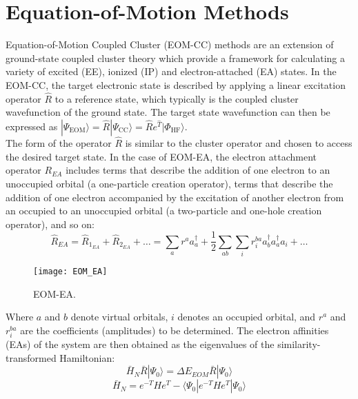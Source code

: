\section{Equation-of-Motion Methods} \label{sec:eom_theory}
Equation-of-Motion Coupled Cluster (EOM-CC) methods are an extension of ground-state coupled cluster theory which provide a framework for calculating a variety of excited (EE), ionized (IP) and electron-attached (EA) states. In the EOM-CC, the target electronic state is described by applying a linear excitation operator $\hat{R}$ to a reference state, which typically is the coupled cluster wavefunction of the ground state. The target state wavefunction can then be expressed as $|\Psi_{\text{EOM}}\rangle = \hat{R} |\Psi_{\text{CC}}\rangle = \hat{R} e^{\hat{T}} |\Phi_{\text{HF}}\rangle$.\\
The form of the operator $\hat{R}$ is similar to the cluster operator and chosen to access the desired target state. In the case of EOM-EA, the electron attachment operator $R_{EA}$ includes terms that describe the addition of one electron to an unoccupied orbital (a one-particle creation operator), terms that describe the addition of one electron accompanied by the excitation of another electron from an occupied to an unoccupied orbital (a two-particle and one-hole creation operator), and so on:
\begin{equation}\label{eq:R_EA}
    \hat{R}_{EA} = \hat{R}_{1_{EA}} + \hat{R}_{2_{EA}} + \ldots = \sum_{a} r^a a_a^{\dagger} + \frac{1}{2}\sum_{ab} \sum_{i} r^{ba}_{i} a_b^{\dagger} a_a^{\dagger} a_i + \ldots
\end{equation}
\begin{figure}
    \centering
    \medskip
    \texttt{[image: EOM\_EA]}
    \caption{EOM-EA.}
    \label{fig:EOM}
  \end{figure}

  Where $a$ and $b$ denote virtual orbitals, $i$ denotes an occupied orbital, and $r^a$ and $r^{ba}_{i}$ are the coefficients (amplitudes) to be determined. The electron affinities (EAs) of the system are then obtained as the eigenvalues of the similarity-transformed Hamiltonian:
\begin{equation}
    \bar{H}_{N} \bar{R} | \Psi_0 \rangle = \Delta E_{EOM} \bar{R} | \Psi_0 \rangle
\end{equation}
\begin{equation}
    \bar{H}_{N} = e^{-T} H e^{T} - \langle \Psi_0 | e^{-T} H e^{T} | \Psi_0 \rangle
\end{equation}

